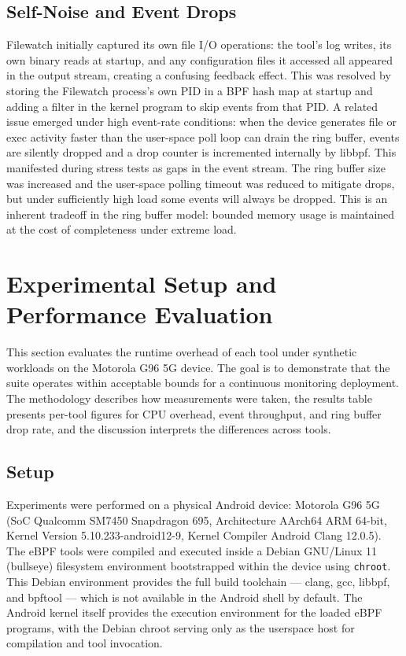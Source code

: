 \documentclass{mnitjaipur}
\begin{document}
\section{Self-Noise and Event Drops}
Filewatch initially captured its own file I/O operations: the tool's log writes, its own binary reads at startup, and any configuration files it accessed all appeared in the output stream, creating a confusing feedback effect. This was resolved by storing the Filewatch process's own PID in a BPF hash map at startup and adding a filter in the kernel program to skip events from that PID. A related issue emerged under high event-rate conditions: when the device generates file or exec activity faster than the user-space poll loop can drain the ring buffer, events are silently dropped and a drop counter is incremented internally by libbpf. This manifested during stress tests as gaps in the event stream. The ring buffer size was increased and the user-space polling timeout was reduced to mitigate drops, but under sufficiently high load some events will always be dropped. This is an inherent tradeoff in the ring buffer model: bounded memory usage is maintained at the cost of completeness under extreme load.

\clearpage
\chapter{Experimental Setup and Performance Evaluation}
This section evaluates the runtime overhead of each tool under synthetic workloads on the Motorola G96 5G device. The goal is to demonstrate that the suite operates within acceptable bounds for a continuous monitoring deployment. The methodology describes how measurements were taken, the results table presents per-tool figures for CPU overhead, event throughput, and ring buffer drop rate, and the discussion interprets the differences across tools.

\section{Setup}
Experiments were performed on a physical Android device: Motorola G96 5G (SoC Qualcomm SM7450 Snapdragon 695, Architecture AArch64 ARM 64-bit, Kernel Version 5.10.233-android12-9, Kernel Compiler Android Clang 12.0.5). The eBPF tools were compiled and executed inside a Debian GNU/Linux 11 (bullseye) filesystem environment bootstrapped within the device using \texttt{chroot}. This Debian environment provides the full build toolchain — clang, gcc, libbpf, and bpftool — which is not available in the Android shell by default. The Android kernel itself provides the execution environment for the loaded eBPF programs, with the Debian chroot serving only as the userspace host for compilation and tool invocation.
\end{document}
